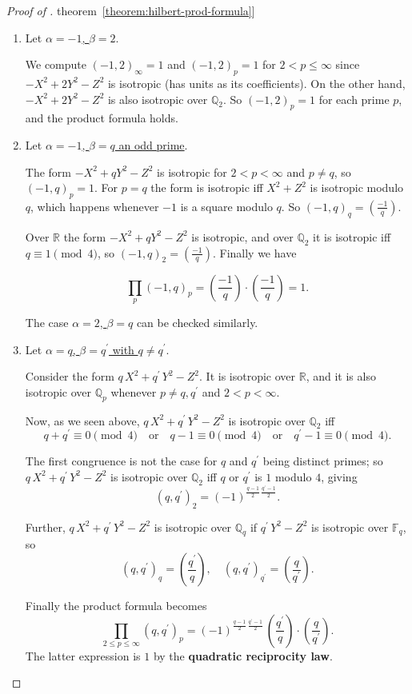 \documentclass{article}
\newcommand{\term}{\textbf}
\newcommand{\legendre}[2]{\left(\frac{#1}{#2}\right)}
\newcommand{\FF}{\mathbb{F}}
\newcommand{\QQ}{\mathbb{Q}}
\newcommand{\refref}[2]{\hyperref[#2]{#1~\ref*{#2}}}
\theoremstyle{myplain}
\theoremstyle{mydefinition}
\begin{document}
\begin{proof}[Proof of \refref{theorem}{theorem:hilbert-prod-formula}]
\begin{enumerate}
  \item Let \underline{$\alpha = -1$, $\beta = 2$}.

    We compute $(-1,2)_\infty = 1$ and $(-1,2)_p = 1$ for $2 < p \le \infty$
    since $-X^2 + 2 Y^2 - Z^2$ is isotropic (has units as its coefficients). On
    the other hand, $-X^2 + 2 Y^2 - Z^2$ is also isotropic over $\QQ_2$. So
    $(-1,2)_p = 1$ for each prime $p$, and the product formula holds.

  \item Let \underline{$\alpha = -1$, $\beta = q$ an odd prime}.

    The form $-X^2 + q Y^2 - Z^2$ is isotropic for $2 < p < \infty$ and
    $p \ne q$, so $(-1,q)_p = 1$. For $p = q$ the form is isotropic iff
    $X^2 + Z^2$ is isotropic modulo $q$, which happens whenever $-1$ is a square
    modulo $q$. So $(-1,q)_q = \legendre{-1}{q}$.

    Over $\mathbb{R}$ the form $-X^2 + q Y^2 - Z^2$ is isotropic, and over
    $\QQ_2$ it is isotropic iff $q \equiv 1 \pmod{4}$, so
    $(-1,q)_2 = \legendre{-1}{q}$. Finally we have

    \[ \prod_p (-1,q)_p = \legendre{-1}{q} \cdot \legendre{-1}{q} = 1. \]

    The case \underline{$\alpha = 2$, $\beta = q$} can be checked similarly.

  \item Let \underline{$\alpha = q$, $\beta = q^\prime$ with $q \ne q^\prime$}.

    Consider the form $q\,X^2 + q^\prime\,Y^2 - Z^2$. It is isotropic over
    $\mathbb{R}$, and it is also isotropic over $\QQ_p$ whenever
    $p \ne q, q^\prime$ and $2 < p < \infty$.

    Now, as we seen above, $q\,X^2 + q^\prime\,Y^2 - Z^2$ is isotropic over
    $\QQ_2$ iff
    \[ q+q^\prime \equiv 0 \pmod{4} \quad\text{or}\quad q - 1 \equiv 0 \pmod{4}
      \quad\text{or}\quad q^\prime - 1 \equiv 0 \pmod{4}. \]

    The first congruence is not the case for $q$ and $q^\prime$ being distinct
    primes; so $q\,X^2 + q^\prime\,Y^2 - Z^2$ is isotropic over $\QQ_2$ iff $q$
    or $q^\prime$ is $1$ modulo $4$, giving
    \[ (q,q^\prime)_2 = (-1)^{\frac{q-1}{2} \, \frac{q^\prime - 1}{2}}. \]

    Further, $q\,X^2 + q^\prime\,Y^2 - Z^2$ is isotropic over $\QQ_q$ if
    $q^\prime\,Y^2 - Z^2$ is isotropic over $\FF_q$, so
    \[ (q,q^\prime)_q = \legendre{q^\prime}{q}, \quad (q,q^\prime)_{q^\prime} = \legendre{q}{q^\prime}. \]

    Finally the product formula becomes
    \[ \prod_{2 \le p \le \infty} (q,q^\prime)_p =
      (-1)^{\frac{q-1}{2} \, \frac{q^\prime-1}{2}} \, \legendre{q^\prime}{q} \cdot \legendre{q}{q^\prime}. \]
    The latter expression is $1$ by the
    \term{quadratic reciprocity law}. \qedhere
  \end{enumerate}
\end{proof}
\end{document}
